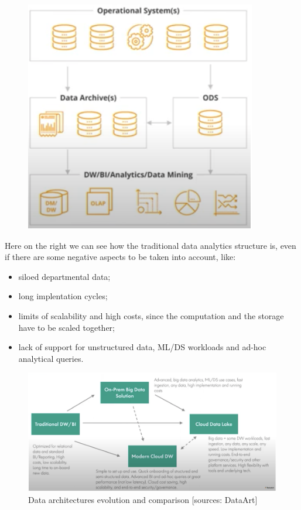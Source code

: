 \begin{figure}
    \centering
    \includegraphics[scale=0.7]{images/traditional_data_analytics_architecture.png}
\end{figure}
Here on the right we can see how the traditional data analytics structure is, even if there are some negative aspects to be taken into account, like:
\begin{itemize}
    \item siloed departmental data;
    \item long implentation cycles;
    \item limits of scalability and high costs, since the computation and the storage have to be scaled together;
    \item lack of support for unstructured data, ML/DS workloads and ad-hoc analytical queries.
\end{itemize}

\begin{figure}[ht!]
    \centering
    \includegraphics[scale=0.65]{images/data_architectures_evolution.png}
    \caption{Data architectures evolution and comparison [sources: DataArt]}
\end{figure}

